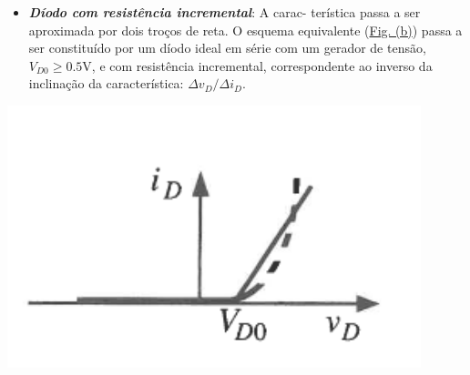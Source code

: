 \begin{center}
    \begin{minipage}{0.6\textwidth}
        \begin{itemize}[leftmargin=*]
        \item[] \textbf{\emph{Díodo com resistência incremental}}: A carac- terística passa a ser aproximada por dois troços de reta. O esquema equivalente (\hyperref[fig:resi-esquema]{Fig. (b)}) passa a ser constituído por um díodo ideal em série com um gerador de tensão, $V_{D0} \ge 0.5$V, e com resistência incremental, correspondente ao inverso da inclinação da característica: $\Delta v_D/ \Delta i_D$.
        \end{itemize}
    \end{minipage}%
    \hfill
    \begin{minipage}{0.4\textwidth}
        \begin{center}
            \includegraphics[width=0.9\textwidth]{img/2/resis.png}
            \label{img:resis}
        \end{center}
    \end{minipage}
\end{center}

